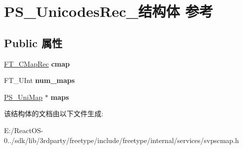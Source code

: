 \hypertarget{struct_p_s___unicodes_rec__}{}\section{P\+S\+\_\+\+Unicodes\+Rec\+\_\+结构体 参考}
\label{struct_p_s___unicodes_rec__}
\subsection*{Public 属性}
\begin{DoxyCompactItemize}
\item 
\mbox{\label{struct_p_s___unicodes_rec___a4c3e28cb86c8a7039107437dcf995da7}} 
\hyperlink{struct_f_t___c_map_rec__}{F\+T\+\_\+\+C\+Map\+Rec} {\bfseries cmap}
\item 
\mbox{\label{struct_p_s___unicodes_rec___abbc3617f13363ddcf851ee229752b08d}} 
F\+T\+\_\+\+U\+Int {\bfseries num\+\_\+maps}
\item 
\mbox{\label{struct_p_s___unicodes_rec___abd0ff1abe19a2a6a838b631ec81d22cd}} 
\hyperlink{struct_p_s___uni_map__}{P\+S\+\_\+\+Uni\+Map} $\ast$ {\bfseries maps}
\end{DoxyCompactItemize}


该结构体的文档由以下文件生成\+:\begin{DoxyCompactItemize}
\item 
E\+:/\+React\+O\+S-\/0../sdk/lib/3rdparty/freetype/include/freetype/internal/services/svpscmap.\+h\end{DoxyCompactItemize}
